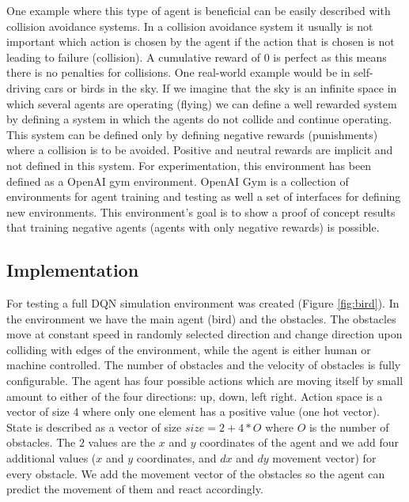 \documentclass[b5paper]{book}
\begin{document}
One example where this type of agent is beneficial can be easily described with collision avoidance systems. In a collision avoidance system it usually is not important which action is chosen by the agent if the action that is chosen is not leading to failure (collision). A cumulative reward of 0 is perfect as this means there is no penalties for collisions. One real-world example would be in self-driving cars or birds in the sky. If we imagine that the sky is an infinite space in which several agents are operating (flying) we can define a well rewarded system by defining a system in which the agents do not collide and continue operating. This system can be defined only by defining negative rewards (punishments) where a collision is to be avoided. Positive and neutral rewards are implicit and not defined in this system. For experimentation, this environment has been defined as a OpenAI gym environment. OpenAI Gym is a collection of environments for agent training and testing as well a set of interfaces for defining new environments. This environment's goal is to show a proof of concept results that training negative agents (agents with only negative rewards) is possible.

\subsection{Implementation}

For testing a full DQN simulation environment was created (Figure \ref{fig:bird}). In the environment we have the main agent (bird) and the obstacles. The obstacles move at constant speed in randomly selected direction and change direction upon colliding with edges of the environment, while the agent is either human or machine controlled. The number of obstacles and the velocity of obstacles is fully configurable. The agent has four possible actions which are moving itself by small amount to either of the four directions: up, down, left right. Action space is a vector of size 4 where only one element has a positive value (one hot vector). State is described as a vector of size \( size = 2 + 4 * O \) where \( O \) is the number of obstacles. The \( 2 \) values are the \( x \) and \( y \) coordinates of the agent and we add four additional values (\( x \) and \( y \) coordinates, and \( dx \) and \( dy \) movement vector) for every obstacle. We add the movement vector of the obstacles so the agent can predict the movement of them and react accordingly.
\end{document}
